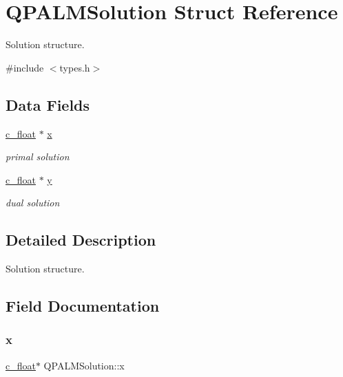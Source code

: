 \hypertarget{structQPALMSolution}{}\section{Q\+P\+A\+L\+M\+Solution Struct Reference}
\label{structQPALMSolution}


Solution structure.  




{\ttfamily \#include $<$types.\+h$>$}

\subsection*{Data Fields}
\begin{DoxyCompactItemize}
\item 
\mbox{\hyperlink{global__opts_8h_a7f1a9fda95e52979658c20a0d134fb15}{c\+\_\+float}} $\ast$ \mbox{\hyperlink{structQPALMSolution_adbe61d11f057bb11037a90f572eb875c}{x}}
\begin{DoxyCompactList}\small\item\em primal solution \end{DoxyCompactList}\item 
\mbox{\hyperlink{global__opts_8h_a7f1a9fda95e52979658c20a0d134fb15}{c\+\_\+float}} $\ast$ \mbox{\hyperlink{structQPALMSolution_a4b4095c2519df9ab081df960dd9c0fea}{y}}
\begin{DoxyCompactList}\small\item\em dual solution \end{DoxyCompactList}\end{DoxyCompactItemize}


\subsection{Detailed Description}
Solution structure. 

\subsection{Field Documentation}
\mbox{\label{structQPALMSolution_adbe61d11f057bb11037a90f572eb875c}} 
\subsubsection{\texorpdfstring{x}{x}}
{\footnotesize\ttfamily \mbox{\hyperlink{global__opts_8h_a7f1a9fda95e52979658c20a0d134fb15}{c\+\_\+float}}$\ast$ Q\+P\+A\+L\+M\+Solution\+::x}




